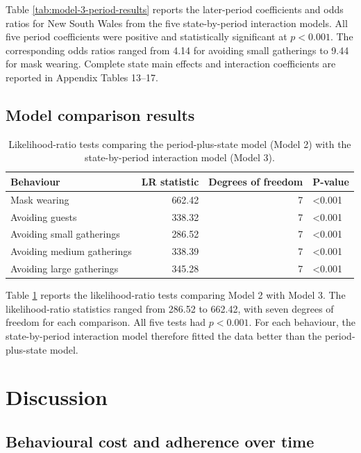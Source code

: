 \documentclass[
  12pt,
  a4paper,
]{article}
\begin{document}
Table \ref{tab:model-3-period-results} reports the later-period
coefficients and odds ratios for New South Wales from the five
state-by-period interaction models. All five period coefficients were
positive and statistically significant at \(p < 0.001\). The corresponding
odds ratios ranged from 4.14 for avoiding small gatherings to 9.44 for
mask wearing. Complete state main effects and interaction coefficients
are reported in Appendix Tables 13--17.

\subsection{Model comparison results}\label{model-comparison-results}

\begin{longtable}[t]{lrrl}
\caption{\label{tab:model-comparison-table}Likelihood-ratio tests comparing the period-plus-state model (Model 2) with the state-by-period interaction model (Model 3).}\\
\toprule
Behaviour & LR statistic & Degrees of freedom & P-value\\
\midrule
Mask wearing & 662.42 & 7 & <0.001\\
Avoiding guests & 338.32 & 7 & <0.001\\
Avoiding small gatherings & 286.52 & 7 & <0.001\\
Avoiding medium gatherings & 338.39 & 7 & <0.001\\
Avoiding large gatherings & 345.28 & 7 & <0.001\\
\bottomrule
\end{longtable}

Table \ref{tab:model-comparison-table} reports the likelihood-ratio
tests comparing Model 2 with Model 3. The likelihood-ratio statistics
ranged from 286.52 to 662.42, with seven degrees of freedom for each
comparison. All five tests had \(p < 0.001\). For each behaviour, the
state-by-period interaction model therefore fitted the data better than
the period-plus-state model.

\section{Discussion}\label{discussion}

\subsection{Behavioural cost and adherence over time}\label{behavioural-cost-and-adherence-over-time}
\end{document}
